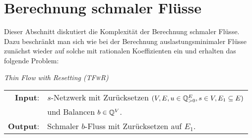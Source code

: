 \section{Berechnung schmaler Flüsse}

Dieser Abschnitt diskutiert die Komplexität der Berechnung schmaler Flüsse.
Dazu beschränkt man sich wie bei der Berechnung auslastungsminimaler Flüsse zunächst wieder auf solche mit rationalen Koeffizienten ein und erhalten das folgende Problem:

\newcommand{\probTFwR}{\textit{\textsc{(TFwR)}}}

\newcommand{\probTFwoR}{\textit{\textsc{(TFwoR)}}}

\begin{center}
	\begin{mdframed}
		\centering
		\emph{Thin Flow with Resetting \probTFwR} \\[1em]
		\begin{tabular}{rl}
			{\bfseries Input}: &$s$-Netzwerk mit Zurücksetzen $(V, E, u \in \mathbb{Q}^E_{>0}, s\in V, E_1\subseteq E)$\\
			& und Balancen $b\in \mathbb{Q}^V$.\\
			{\bfseries Output}: &Schmaler $b$-Fluss mit Zurücksetzen auf $E_1$.
		\end{tabular}
	\end{mdframed}
\end{center}

